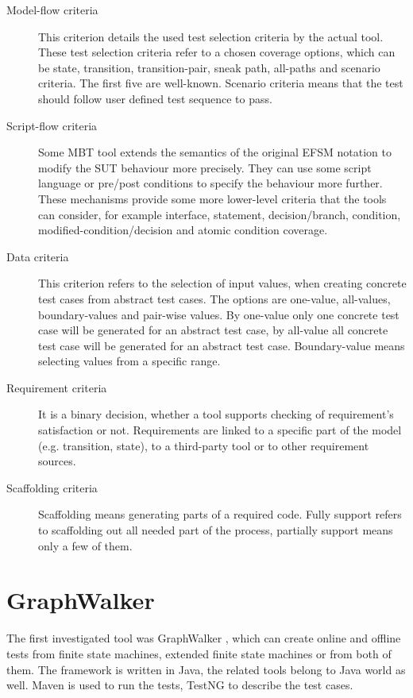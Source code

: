 \begin{description}
	\item[Model-flow criteria] This criterion details the used test selection criteria by the actual tool. These test selection criteria refer to a chosen coverage options, which can be state, transition, transition-pair, sneak path, all-paths and scenario criteria. The first five are well-known. Scenario criteria means that the test should follow user defined test sequence to pass.
	\item[Script-flow criteria] Some MBT tool extends the semantics of the original EFSM notation to modify the SUT behaviour more precisely. They can use some script language or pre/post conditions to specify the behaviour more further. These mechanisms provide some more lower-level criteria that the tools can consider, for example interface, statement, decision/branch, condition, modified-condition/decision and atomic condition coverage.
	\item[Data criteria] This criterion refers to the selection of input values, when creating concrete test cases from abstract test cases. The options are one-value, all-values, boundary-values and pair-wise values. By one-value only one concrete test case will be generated for an abstract test case, by all-value all concrete test case will be generated for an abstract test case. Boundary-value means selecting values from a specific range.
	\item[Requirement criteria] It is a binary decision, whether a tool supports checking of requirement's satisfaction or not. Requirements are linked to a specific part of the model (e.g. transition, state), to a third-party tool or to other requirement sources.
	\item[Scaffolding criteria] Scaffolding means generating parts of a required code. Fully support refers to scaffolding out all needed part of the process, partially support means only a few of them.
\end{description}

\section{GraphWalker}
\label{sec:graphwalker}

The first investigated tool was GraphWalker \cite{graphwalker}, which can create online and offline tests from finite state machines, extended finite state machines or from both of them. The framework is written in Java, the related tools belong to Java world as well. Maven is used to run the tests, TestNG to describe the test cases.


